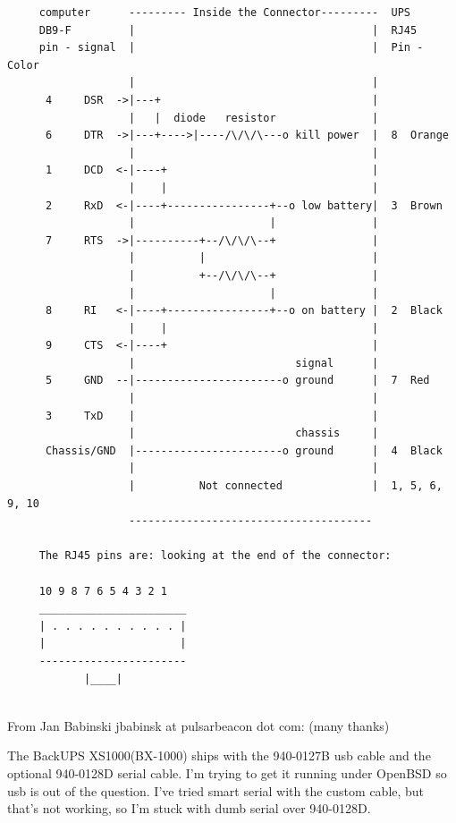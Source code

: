 {{{{{{{{{{\begin{verbatim}
     computer      --------- Inside the Connector---------  UPS
     DB9-F         |                                     |  RJ45
     pin - signal  |                                     |  Pin - Color
                   |                                     |
      4     DSR  ->|---+                                 |
                   |   |  diode   resistor               |
      6     DTR  ->|---+---->|----/\/\/\---o kill power  |  8  Orange
                   |                                     |
      1     DCD  <-|----+                                |
                   |    |                                |
      2     RxD  <-|----+----------------+--o low battery|  3  Brown
                   |                     |               |
      7     RTS  ->|----------+--/\/\/\--+               |
                   |          |                          |
                   |          +--/\/\/\--+               |
                   |                     |               |
      8     RI   <-|----+----------------+--o on battery |  2  Black
                   |    |                                |
      9     CTS  <-|----+                                |
                   |                         signal      |
      5     GND  --|-----------------------o ground      |  7  Red
                   |                                     |
      3     TxD    |                                     |
                   |                         chassis     |
      Chassis/GND  |-----------------------o ground      |  4  Black
                   |                                     |
                   |          Not connected              |  1, 5, 6, 9, 10
                   --------------------------------------
     
     The RJ45 pins are: looking at the end of the connector:
     
     10 9 8 7 6 5 4 3 2 1
     _______________________
     | . . . . . . . . . . |
     |                     |
     -----------------------
            |____|
     
\end{verbatim}
\normalsize

From Jan Babinski jbabinsk at pulsarbeacon dot com: (many thanks)  

The BackUPS XS1000(BX-1000) ships with the 940-0127B usb cable and the
optional 940-0128D serial cable. I'm trying to get it running under OpenBSD so
usb is out of the question. I've tried smart serial with the custom cable, but
that's not working, so I'm stuck with dumb serial over 940-0128D.  

}}}}}}}}}}
